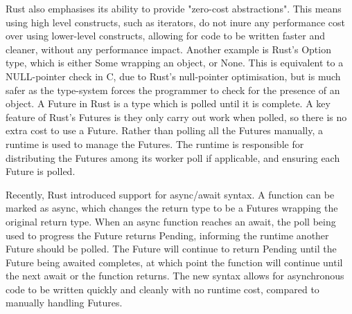 \documentclass{l4proj}
\begin{document}
Rust also emphasises its ability to provide "zero-cost abstractions".
This means using high level constructs, such as iterators, do not inure any performance cost over using lower-level
constructs, allowing for code to be written faster and cleaner, without any performance impact.
Another example is Rust's Option type, which is either Some wrapping an object, or None.
This is equivalent to a NULL-pointer check in C, due to Rust's null-pointer optimisation, but is much safer as the
type-system forces the programmer to check for the presence of an object.
A Future in Rust is a type which is polled until it is complete.
A key feature of Rust's Futures is they only carry out work when polled, so there is no extra cost to use a Future.
Rather than polling all the Futures manually, a runtime is used to manage the Futures.
The runtime is responsible for distributing the Futures among its worker poll if applicable, and ensuring each Future is
polled.

Recently, Rust introduced support for async/await syntax.
A function can be marked as async, which changes the return type to be a Futures wrapping the original return type.
When an async function reaches an await, the poll being used to progress the Future returns Pending, informing the
runtime another Future should be polled.
The Future will continue to return Pending until the Future being awaited completes, at which point the function will
continue until the next await or the function returns.
The new syntax allows for asynchronous code to be written quickly and cleanly with no runtime cost, compared to manually
handling Futures.

\end{document}
